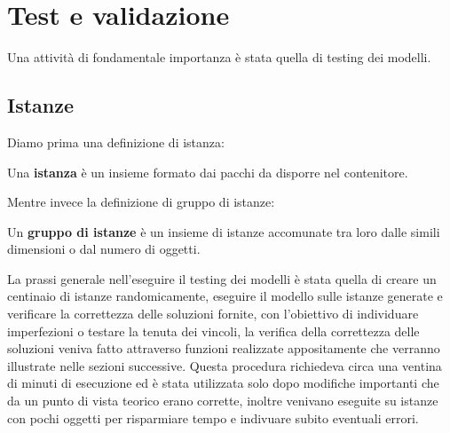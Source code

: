 
\hypertarget{(chap:capitolo5)}{}
\chapter{Test e validazione}
Una attività di fondamentale importanza è stata quella di testing dei modelli.
\section{Istanze}
Diamo prima una definizione di istanza:
\begin{center}
	Una \textbf{istanza} è un insieme formato dai pacchi da disporre nel contenitore.
\end{center}
Mentre invece la definizione di gruppo di istanze:
\begin{center}
	Un \textbf{gruppo di istanze} è un insieme di istanze accomunate tra loro dalle simili dimensioni o dal numero di oggetti.

\end{center}
La prassi generale nell'eseguire il testing dei modelli è stata quella di creare un centinaio di istanze randomicamente, eseguire il modello sulle istanze generate e verificare la correttezza delle soluzioni fornite, con l'obiettivo di individuare imperfezioni o testare la tenuta dei vincoli, la verifica della correttezza delle soluzioni veniva fatto attraverso funzioni realizzate appositamente che verranno illustrate nelle sezioni successive.
Questa procedura richiedeva circa una ventina di minuti di esecuzione ed è stata utilizzata solo dopo modifiche importanti che da un punto di vista teorico erano corrette, inoltre venivano eseguite su istanze con pochi oggetti per risparmiare tempo e indivuare subito eventuali errori.

